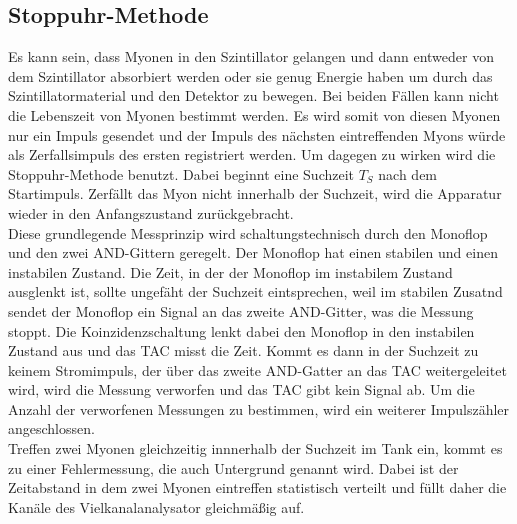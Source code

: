 \subsection{Stoppuhr-Methode}
\label{subsec:Messmethode}
Es kann sein, dass Myonen in den Szintillator gelangen und dann entweder von dem Szintillator absorbiert werden oder sie genug 
Energie haben um durch das Szintillatormaterial und den Detektor zu bewegen. Bei beiden Fällen kann nicht die Lebenszeit von Myonen bestimmt werden.
Es wird somit von diesen Myonen nur ein Impuls gesendet und der Impuls des nächsten eintreffenden Myons würde als Zerfallsimpuls des ersten
registriert werden. Um dagegen zu wirken
wird die Stoppuhr-Methode benutzt. Dabei beginnt eine Suchzeit $T_S$ nach dem Startimpuls. Zerfällt das Myon nicht innerhalb der Suchzeit,
wird die Apparatur wieder in den Anfangszustand zurückgebracht.\\
Diese grundlegende Messprinzip wird schaltungstechnisch durch den Monoflop und den zwei AND-Gittern geregelt.
Der Monoflop hat einen stabilen und einen instabilen Zustand.
Die Zeit, in der der Monoflop im instabilem Zustand ausglenkt ist, sollte ungefäht der Suchzeit eintsprechen, weil im stabilen Zusatnd sendet
der Monoflop ein Signal an das zweite AND-Gitter, was die Messung stoppt.
Die Koinzidenzschaltung lenkt dabei den Monoflop in den instabilen Zustand aus und das TAC misst die Zeit. Kommt es dann in der Suchzeit zu keinem
Stromimpuls, der über das zweite AND-Gatter an das TAC weitergeleitet wird, wird die Messung verworfen und das TAC gibt kein Signal ab.
Um die Anzahl der verworfenen Messungen zu bestimmen, wird ein weiterer Impulszähler angeschlossen.\\
Treffen zwei Myonen gleichzeitig innnerhalb der Suchzeit im Tank ein, kommt es zu einer Fehlermessung, die auch Untergrund genannt wird.
Dabei ist der Zeitabstand in dem zwei Myonen eintreffen statistisch verteilt und füllt daher die Kanäle des Vielkanalanalysator gleichmäßig auf.

